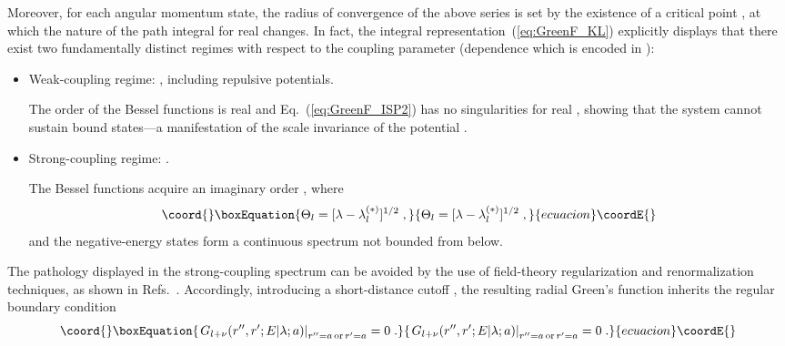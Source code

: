 \documentclass[a4paper,preprint,draft,showpacs,amsmath,amsfonts,amssymb,aps,prd]{revtex4}%
\begin{document}
Moreover, for each angular momentum state,
the radius of convergence of the above series is set by the 
existence of a critical point 
\coordHE{}, at which the
nature of the path integral for real \myHighlight{$\lambda$}\coordHE{} changes.
In fact, the integral representation~(\ref{eq:GreenF_KL})
explicitly displays that there exist two fundamentally distinct regimes
with respect to the coupling parameter \myHighlight{$\lambda$}\coordHE{} (dependence which
is encoded in \coordHE{}):
\begin{itemize}
\item
{\sf 
Weak-coupling regime\/}:
\coordHE{}, including repulsive potentials.

The order \coordHE{} of the Bessel functions  is real
and Eq.~(\ref{eq:GreenF_ISP2}) has no singularities for real \myHighlight{$\kappa$}\coordHE{}, 
showing that
the system cannot sustain bound states---a manifestation of 
the scale invariance of the potential \coordHE{}.

\item
{\sf 
Strong-coupling regime\/}:
\coordHE{}.

The Bessel functions acquire an imaginary order \coordHE{},
where 
\begin{equation}\coord{}\boxEquation{
\Theta_{l} 
= [ \lambda - \lambda_{l}^{(\ast)} ]^{1/2}
\;  ,
\label{eq:theta_coupling}
}{
\Theta_{l} 
= [ \lambda - \lambda_{l}^{(\ast)} ]^{1/2}
\;  ,
}{ecuacion}\coordE{}\end{equation}
 and the negative-energy states form a
continuous spectrum not bounded from below. 
\end{itemize}

 The pathology displayed in the strong-coupling
spectrum can be avoided by the use of field-theory
regularization and renormalization techniques,
as shown in Refs.~\cite{gup:93,cam:00,cam:01}.
Accordingly, introducing a short-distance cutoff
\coordHE{}, 
the resulting radial Green's function
\coordHE{}
inherits the
regular boundary condition 
\begin{equation}\coord{}\boxEquation{
\left. G_{l+\nu} (r'',r';E|\lambda;a)
\right|_{r''=a \, {\rm or } \, r'=a}  
=0
\;  .
\label{eq:regularized_BC}
}{
\left. G_{l+\nu} (r'',r';E|\lambda;a)
\right|_{r''=a \, {\rm or } \, r'=a}  
=0
\;  .
}{ecuacion}\coordE{}\end{equation} 
\end{document}
